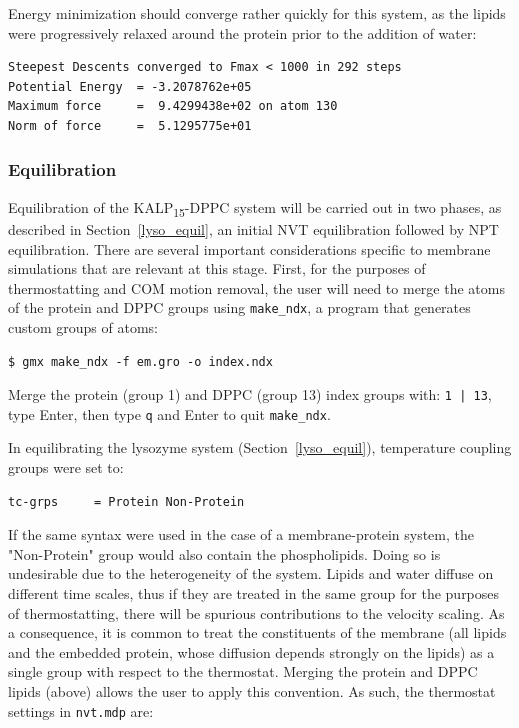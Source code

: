 \documentclass[9pt,tutorial,pubversion]{livecoms}
\begin{document}
Energy minimization should converge rather quickly for this system, as the lipids were progressively relaxed around the protein prior to the addition of water:

\begin{lstlisting}[basicstyle=\footnotesize\ttfamily]
Steepest Descents converged to Fmax < 1000 in 292 steps
Potential Energy  = -3.2078762e+05
Maximum force     =  9.4299438e+02 on atom 130
Norm of force     =  5.1295775e+01
\end{lstlisting}

\subsubsection{Equilibration} \label{kalp_equil}

Equilibration of the KALP\textsubscript{15}-DPPC system will be carried out in two phases, as described in Section~\ref{lyso_equil}, an initial NVT equilibration followed by NPT equilibration. There are several important considerations specific to membrane simulations that are relevant at this stage. First, for the purposes of thermostatting and COM motion removal, the user will need to merge the atoms of the protein and DPPC groups using \texttt{make\_ndx}, a program that generates custom groups of atoms:

\begin{lstlisting}
$ gmx make_ndx -f em.gro -o index.ndx
\end{lstlisting}

Merge the protein (group 1) and DPPC (group 13) index groups with: \texttt{1 | 13}, type Enter, then type \texttt{q} and Enter to quit \texttt{make\_ndx}.

In equilibrating the lysozyme system (Section~\ref{lyso_equil}), temperature coupling groups were set to:

\begin{lstlisting}
tc-grps     = Protein Non-Protein
\end{lstlisting}

If the same syntax were used in the case of a membrane-protein system, the "Non-Protein" group would also contain the phospholipids. Doing so is undesirable due to the heterogeneity of the system. Lipids and water diffuse on different time scales, thus if they are treated in the same group for the purposes of thermostatting, there will be spurious contributions to the velocity scaling. As a consequence, it is common to treat the constituents of the membrane (all lipids and the embedded protein, whose diffusion depends strongly on the lipids) as a single group with respect to the thermostat. Merging the protein and DPPC lipids (above) allows the user to apply this convention. As such, the thermostat settings in \texttt{nvt.mdp} are:
\end{document}
